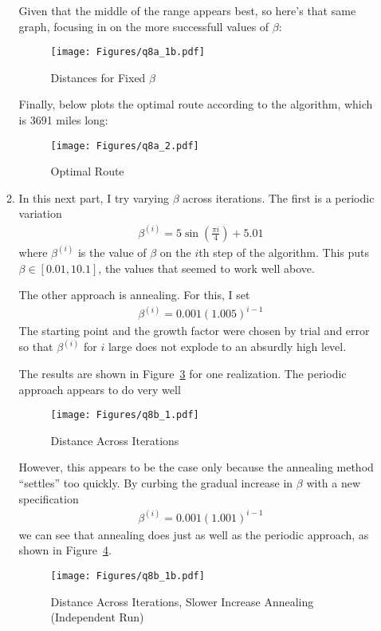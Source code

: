 \documentclass[12pt]{article}
\theoremstyle{plain}
\theoremstyle{definition}
\theoremstyle{remark}
\begin{document}
\begin{enumerate}
\begin{enumerate}
      Given that the middle of the range appears best, so here's that
      same graph, focusing in on the more successfull values of $\beta$:
      \begin{figure}[htpb!]
        \centering
        \caption{Distances for Fixed $\beta$}
        \label{fig:q8a.2}
        \texttt{[image: Figures/q8a\_1b.pdf]}
      \end{figure}
      Finally, below plots the optimal route according to the algorithm,
      which is 3691 miles long:
      \begin{figure}[htpb!]
        \centering
        \caption{Optimal Route}
        \label{fig:q8a.3}
        \texttt{[image: Figures/q8a\_2.pdf]}
      \end{figure}

    \item %
      In this next part, I try varying $\beta$ across iterations. The
      first is a periodic variation
      \begin{align*}
        \beta^{(i)} = 5 \sin \left(\frac{\pi i}{4}\right) + 5.01
      \end{align*}
      where $\beta^{(i)}$ is the value of $\beta$ on the $i$th step of
      the algorithm. This puts $\beta \in [0.01, 10.1]$, the values that
      seemed to work well above.

      The other approach is annealing. For this, I set
      \begin{align*}
        \beta^{(i)} = 0.001  (1.005)^{i-1}
      \end{align*}
      The starting point and the growth factor were chosen by trial and
      error so that $\beta^{(i)}$ for $i$ large does not explode to an
      absurdly high level.

      The results are shown in Figure~\ref{fig:q8b.1} for one
      realization. The periodic approach appears to do very well
      \begin{figure}[htpb!]
        \centering
        \caption{Distance Across Iterations}
        \label{fig:q8b.1}
        \texttt{[image: Figures/q8b\_1.pdf]}
      \end{figure}

      However, this appears to be the case only because the annealing
      method ``settles'' too quickly. By curbing the gradual increase in
      $\beta$ with a new specification
      \begin{align*}
        \beta^{(i)} = 0.001  (1.001)^{i-1}
      \end{align*}
      we can see that annealing does just as well as the periodic
      approach, as shown in Figure~\ref{fig:q8b.2}.
      \begin{figure}[htpb!]
        \centering
        \caption{Distance Across Iterations, Slower Increase Annealing (Independent Run)}
        \label{fig:q8b.2}
        \texttt{[image: Figures/q8b\_1b.pdf]}
      \end{figure}


\end{enumerate}
\end{enumerate}
\end{document}

